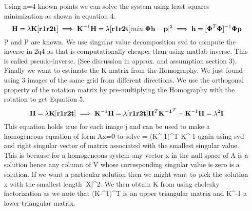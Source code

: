 \documentclass[titlepage]{article}
\begin{document}
Using  n=4 known points we can solve the system using least squares minimization as shown in equation 4.
\begin{equation}
    \label{Least Squares}
    \mathbf{H} = \lambda \mathbf{K} [\mathbf{r1} \mathbf{r2} \mathbf{t}] \implies \mathbf{K}^{-1} \mathbf{H} = \lambda [\mathbf{r1} \mathbf{r2} \mathbf{t}]\\
    min |\mathbf{\Phi} \mathbf{h} - \mathbf{p}|^2 \implies \mathbf{h} = [\mathbf{\Phi}^T \mathbf{\Phi}]^{-1} \mathbf{\Phi} \mathbf{p}
    \end{equation}
P and P are known. We use singular value decomposition svd to compute the inverse in 2q4 as that is computationally cheaper than using matlab inverse. This is called pseudo-inverse. (See discussion in approx. and assumption section 3).
Finally we want to estimate the K matrix from the Homography. We just found using 3 images of the same grid from different directions. We use the orthogonal property of the rotation matrix by pre-multiplying the Homography with the rotation to get Equation 5.
\begin{equation}
    \label{K from H}
    \mathbf{H} = \lambda \mathbf{K} [\mathbf{r1} \mathbf{r2} \mathbf{t}] \implies \mathbf{K}^{-1} \mathbf{H} = \lambda [\mathbf{r1} \mathbf{r2} \mathbf{t}]\\
    \mathbf{H}^T \mathbf{K^{-1}}^{T} - \mathbf{K}^{-1} \mathbf{H} = \lambda^2 \mathbf{I}
    \end{equation}
This equation holds true for each image j and can be used to make a homogeneous equation of form Ax=0 to solve  \Phi = (K^-1)^T K^-1 again using svd and right singular vector of matrix \Phi associated with the smallest singular value. This is because for a homogeneous system any vector x in the null space of A is a solution hence any column of V whose corresponding singular value is zero is a solution. If we want a particular solution then we might want to pick the solution x with the smallest length |X|^2. We then obtain K from \Phi using cholesky factorization as we note that (K-^1)^T is an upper triangular matrix and K^-1 a lower triangular matrix.
\end{document}
